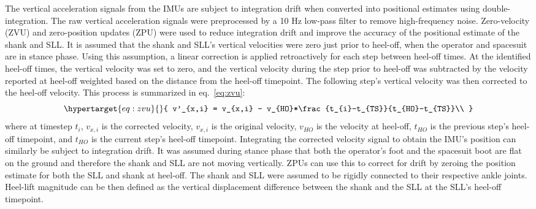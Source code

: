\documentclass[defaultstyle,11pt]{comps}
\begin{document}
The vertical acceleration signals from the IMUs are subject to integration drift when converted into positional estimates using double-integration.
The raw vertical acceleration signals were preprocessed by a 10 Hz low-pass filter to remove high-frequency noise\citep{Antonsson1985}.
Zero-velocity (ZVU) and zero-position updates (ZPU) were used to reduce integration drift and improve the accuracy of the positional estimate of the shank and SLL.
It is assumed that the shank and SLL's vertical velocities were zero just prior to heel-off, when the operator and spacesuit are in stance phase.
Using this assumption, a linear correction is applied retroactively for each step between heel-off times.
At the identified heel-off times, the vertical velocity was set to zero, and the vertical velocity during the step prior to heel-off was subtracted by the velocity reported at heel-off weighted based on the distance from the heel-off timepoint.
The following step's vertical velocity was then corrected to the heel-off velocity.
This process is summarized in eq.~\ref{eq:zvu}:
\begin{equation}\protect\hypertarget{eq:zvu}{}{
v'_{x,i} = v_{x,i} - v_{HO}*\frac{t_{i}-t_{TS}}{t_{HO}-t_{TS}}\\
}\label{eq:zvu}\end{equation}
where at timestep \(t_i\), \(v_{x,i}\) is the corrected velocity, \(v_{x,i}\) is the original velocity, \(v_{HO}\) is the velocity at heel-off, \(t_{HO}\) is the previous step's heel-off timepoint, and \(t_{HO}\) is the current step's heel-off timepoint.
Integrating the corrected velocity signal to obtain the IMU's position can similarly be subject to integration drift.
It was assumed during stance phase that both the operator's foot and the spacesuit boot are flat on the ground and therefore the shank and SLL are not moving vertically.
ZPUs can use this to correct for drift by zeroing the position estimate for both the SLL and shank at heel-off.
The shank and SLL were assumed to be rigidly connected to their respective ankle joints.
Heel-lift magnitude can be then defined as the vertical displacement difference between the shank and the SLL at the SLL's heel-off timepoint.
\end{document}
